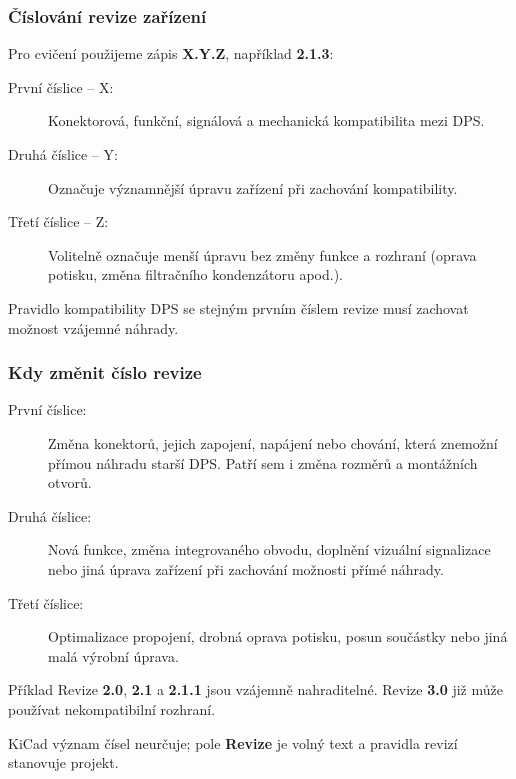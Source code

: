 \documentclass{beamer}
\begin{document}
\begin{frame}
	\frametitle{Číslování revize zařízení}
	Pro cvičení použijeme zápis \textbf{X.Y.Z}, například \textbf{2.1.3}:

	\medskip
	\begin{description}
		\item[První číslice -- X:] Konektorová, funkční, signálová a mechanická kompatibilita mezi DPS.
		\item[Druhá číslice -- Y:] Označuje významnější úpravu zařízení při zachování kompatibility.
		\item[Třetí číslice -- Z:] Volitelně označuje menší úpravu bez změny funkce a rozhraní (oprava potisku, změna filtračního kondenzátoru apod.).
	\end{description}

	\vfill
	\begin{block}{Pravidlo kompatibility}
		DPS se stejným prvním číslem revize musí zachovat možnost vzájemné náhrady.
	\end{block}
\end{frame}

\begin{frame}
	\frametitle{Kdy změnit číslo revize}
	\begin{description}
		\item[První číslice:] Změna konektorů, jejich zapojení, napájení nebo chování, která znemožní přímou náhradu starší DPS. Patří sem i změna rozměrů a montážních otvorů.
		\item[Druhá číslice:] Nová funkce, změna integrovaného obvodu, doplnění vizuální signalizace nebo jiná úprava zařízení při zachování možnosti přímé náhrady.
		\item[Třetí číslice:] Optimalizace propojení, drobná oprava potisku, posun součástky nebo jiná malá výrobní úprava.
	\end{description}

	\vfill
	\begin{exampleblock}{Příklad}
		Revize \textbf{2.0}, \textbf{2.1} a \textbf{2.1.1} jsou vzájemně nahraditelné. Revize \textbf{3.0} již může používat nekompatibilní rozhraní.
	\end{exampleblock}

	\smallskip
	KiCad význam čísel neurčuje; pole \textbf{Revize} je volný text a pravidla revizí stanovuje projekt.
\end{frame}
\end{document}
